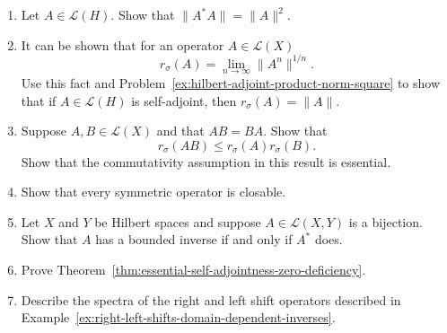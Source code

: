 \begin{enumerate}[label=\thesection.\arabic*.,ref=\thesection.\arabic*,start=24,series=book-problems]
\item\label{ex:hilbert-adjoint-product-norm-square} Let $A\in\mathcal{L}(H)$. Show that $\|A^*A\|=\|A\|^2$.

\item\label{ex:self-adjoint-spectral-radius-equals-norm} It can be shown that for an operator $A\in\mathcal{L}(X)$\[r_\sigma(A)=\lim_{n\to\infty}\|A^n\|^{1/n}.\]Use this fact and Problem~\ref{ex:hilbert-adjoint-product-norm-square} to show that if $A\in\mathcal{L}(H)$ is self-adjoint, then $r_\sigma(A)=\|A\|$.

\item\label{ex:commuting-operator-product-spectral-radius} Suppose $A,B\in\mathcal{L}(X)$ and that $AB=BA$. Show that\[r_\sigma(AB)\leq r_\sigma(A)r_\sigma(B).\]Show that the commutativity assumption in this result is essential.

\item\label{ex:symmetric-operator-closable} Show that every symmetric operator is closable.

\item\label{ex:hilbert-adjoint-bounded-inverse-equivalence} Let $X$ and $Y$ be Hilbert spaces and suppose $A\in\mathcal{L}(X,Y)$ is a bijection. Show that $A$ has a bounded inverse if and only if $A^*$ does.

\item\label{ex:essential-self-adjointness-deficiency-proof} Prove Theorem~\ref{thm:essential-self-adjointness-zero-deficiency}.

\item\label{ex:right-left-shift-spectra} Describe the spectra of the right and left shift operators described in Example~\ref{ex:right-left-shifts-domain-dependent-inverses}.

\end{enumerate}
